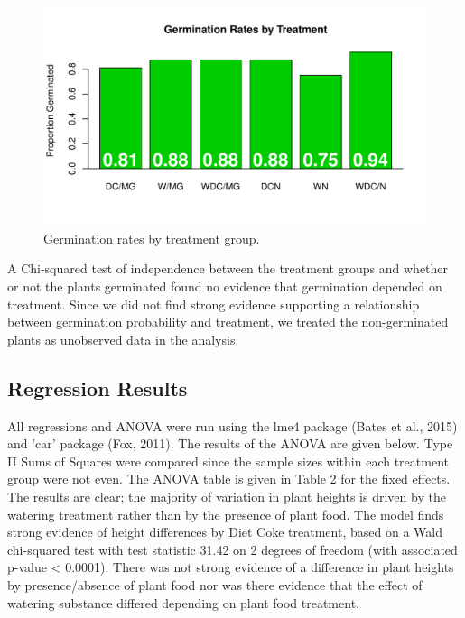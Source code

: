 \documentclass[1p,12pt]{elsarticle}\usepackage[]{graphicx}\usepackage[]{color}
\makeatletter
\def\maxwidth{ %
  \ifdim\Gin@nat@width>\linewidth
    \linewidth
  \else
    \Gin@nat@width
  \fi
}
\newenvironment{knitrout}{}{} %
\makeatother
\begin{document}
\begin{knitrout}
\color{fgcolor}\begin{figure}
\includegraphics[width=\maxwidth]{figure/germination_rates-1} \caption[Germination rates by treatment group]{Germination rates by treatment group.}\label{fig:germination_rates}
\end{figure}


\end{knitrout}

A Chi-squared test of independence between the treatment groups and whether or not the plants germinated found no evidence that germination depended on treatment.  Since we did not find strong evidence supporting a relationship between germination probability and treatment, we treated the non-germinated plants as unobserved data in the analysis. 



\subsection{Regression Results}

All regressions and ANOVA were run using the lme4 package (Bates et al., 2015) and 'car' package (Fox, 2011). The results of the ANOVA are given below. Type II Sums of Squares were compared since the sample sizes within each treatment group were not even. The ANOVA table is given in Table 2 for the fixed effects. The results are clear; the majority of variation in plant heights is driven by the watering treatment rather than by the presence of plant food.  The model finds strong evidence of height differences by Diet Coke treatment, based on a Wald chi-squared test with test statistic 31.42 on 2 degrees of freedom (with associated p-value < 0.0001). There was not strong evidence of a difference in plant heights by presence/absence of plant food nor was there evidence that the effect of watering substance differed depending on plant food treatment. 
\end{document}
